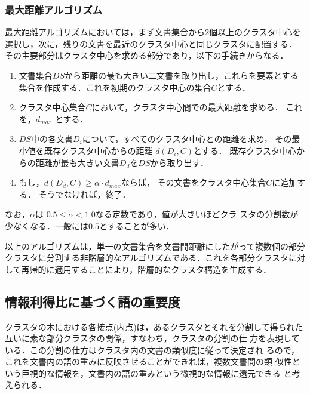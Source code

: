 \subsubsection{最大距離アルゴリズム}

最大距離アルゴリズムにおいては，まず文書集合から2個以上のクラスタ中心を
選択し，次に，残りの文書を最近のクラスタ中心と同じクラスタに配置する．
その主要部分はクラスタ中心を求める部分であり，以下の手続きからなる．
\begin{enumerate}
 \item 文書集合$DS$から距離の最も大きい二文書を取り出し，これらを要素とする
       集合を作成する．これを初期のクラスタ中心の集合$C$とする．
 \item クラスタ中心集合$C$において，クラスタ中心間での最大距離を求める．
       これを，$d_{max}$ とする．
 \item $DS$中の各文書$D_i$について，すべてのクラスタ中心との距離を求め，
       その最小値を既存クラスタ中心からの距離 $d(D_i,C)$とする．
        既存クラスタ中心からの距離が最も大きい文書$D_d$を$DS$から取り出す．
 \item もし，$d(D_d,C) \ge \alpha\cdot d_{max}$ならば，
       その文書をクラスタ中心集合$C$に追加する．
       そうでなければ，終了．
\end{enumerate}
なお，$\alpha$は $0.5 \leq \alpha < 1.0$なる定数であり，値が大きいほどクラ
スタの分割数が少なくなる．一般には$0.5$とすることが多い．

以上のアルゴリズムは，単一の文書集合を文書間距離にしたがって複数個の部分
クラスタに分割する非階層的なアルゴリズムである．これを各部分クラスタに対
して再帰的に適用することにより，階層的なクラスタ構造を生成する．

\subsection{情報利得比に基づく語の重要度}

クラスタの木における各接点(内点)は，あるクラスタとそれを分割して得られた
互いに素な部分クラスタの関係，すなわち，クラスタの分割の仕
方を表現している．この分割の仕方はクラスタ内の文書の類似度に従って決定され
るので，これを文書内の語の重みに反映させることができれば，複数文書間の類
似性という巨視的な情報を，文書内の語の重みという微視的な情報に還元できる
と考えられる．

